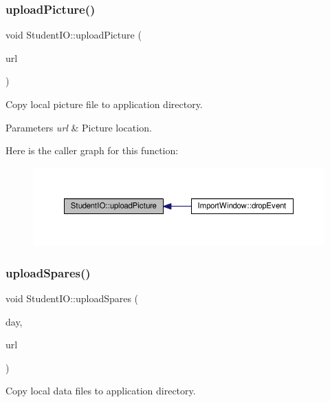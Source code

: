 \subsubsection{\texorpdfstring{upload\+Picture()}{uploadPicture()}}
{\footnotesize\ttfamily void Student\+I\+O\+::upload\+Picture (\begin{DoxyParamCaption}\item[{Q\+Url}]{url }\end{DoxyParamCaption})}



Copy local picture file to application directory. 


\begin{DoxyParams}{Parameters}
{\em url} & Picture location. \\
\hline
\end{DoxyParams}
Here is the caller graph for this function\+:
\nopagebreak
\begin{figure}[H]
\begin{center}
\leavevmode
\includegraphics[width=350pt]{class_student_i_o_ae12678a20ba4ca76eaa5eff8385b32d8_icgraph}
\end{center}
\end{figure}
\mbox{\label{class_student_i_o_ad3c9ae8b97a47fb33373b51d06327bd9}} 
\subsubsection{\texorpdfstring{upload\+Spares()}{uploadSpares()}}
{\footnotesize\ttfamily void Student\+I\+O\+::upload\+Spares (\begin{DoxyParamCaption}\item[{int}]{day,  }\item[{Q\+Url}]{url }\end{DoxyParamCaption})}



Copy local data files to application directory. 


